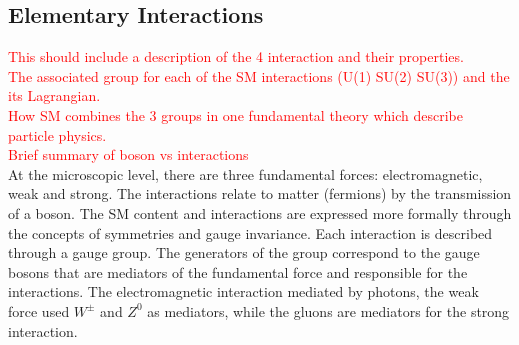 \subsection{Elementary Interactions}
\label{chap1:SM:EI}
\textcolor{red}{This should include a description of the 4 interaction and their properties.\\
The associated group for each of the SM interactions (U(1) SU(2) SU(3)) and the its Lagrangian.\\
How SM combines the 3 groups in one fundamental theory which describe particle physics.\\
Brief summary of boson vs interactions
} \\
At the microscopic level, there are three fundamental forces: electromagnetic, weak and strong. The interactions relate to matter (fermions) by the transmission of a boson. The SM content and interactions are expressed more formally through the concepts of symmetries and gauge invariance. Each interaction is described through a gauge group. The generators of the group correspond to the gauge bosons that are mediators of the fundamental force and responsible for the interactions. The electromagnetic interaction mediated by photons, the weak force used $W^{\pm}$ and $Z^{0}$ as mediators, while the gluons are mediators for the strong interaction.
